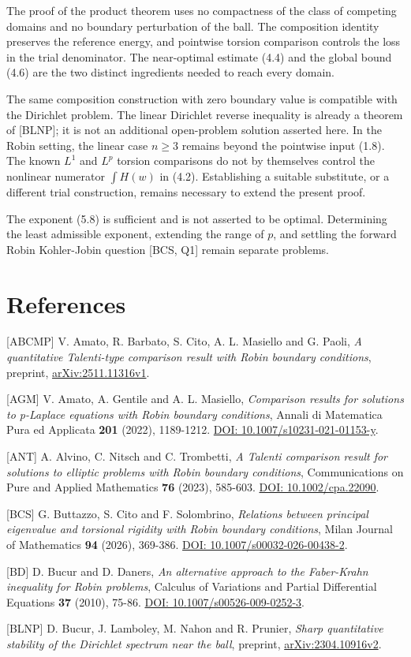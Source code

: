 \documentclass[11pt]{article}
\begin{document}
The proof of the product theorem uses no compactness of the class of
competing domains and no boundary perturbation of the ball. The
composition identity preserves the reference energy, and pointwise
torsion comparison controls the loss in the trial denominator. The
near-optimal estimate (4.4) and the global bound (4.6) are the two
distinct ingredients needed to reach every domain.

The same composition construction with zero boundary value is compatible
with the Dirichlet problem. The linear Dirichlet reverse inequality is
already a theorem of {[}BLNP{]}; it is not an additional open-problem
solution asserted here. In the Robin setting, the linear case \(n\geq3\)
remains beyond the pointwise input (1.8). The known \(L^1\) and \(L^p\)
torsion comparisons do not by themselves control the nonlinear numerator
\(\int H(w)\) in (4.2). Establishing a suitable substitute, or a
different trial construction, remains necessary to extend the present
proof.

The exponent (5.8) is sufficient and is not asserted to be optimal.
Determining the least admissible exponent, extending the range of \(p\),
and settling the forward Robin Kohler-Jobin question {[}BCS, Q1{]}
remain separate problems.

\sloppy\section{References}\label{references}

{[}ABCMP{]} V. Amato, R. Barbato, S. Cito, A. L. Masiello and G. Paoli,
\emph{A quantitative Talenti-type comparison result with Robin boundary
conditions}, preprint,
\href{https://arxiv.org/abs/2511.11316v1}{arXiv:2511.11316v1}.

{[}AGM{]} V. Amato, A. Gentile and A. L. Masiello, \emph{Comparison
results for solutions to p-Laplace equations with Robin boundary
conditions}, Annali di Matematica Pura ed Applicata \textbf{201} (2022),
1189-1212. \href{https://doi.org/10.1007/s10231-021-01153-y}{DOI:
10.1007/s10231-021-01153-y}.

{[}ANT{]} A. Alvino, C. Nitsch and C. Trombetti, \emph{A Talenti
comparison result for solutions to elliptic problems with Robin boundary
conditions}, Communications on Pure and Applied Mathematics \textbf{76}
(2023), 585-603. \href{https://doi.org/10.1002/cpa.22090}{DOI:
10.1002/cpa.22090}.

{[}BCS{]} G. Buttazzo, S. Cito and F. Solombrino, \emph{Relations
between principal eigenvalue and torsional rigidity with Robin boundary
conditions}, Milan Journal of Mathematics \textbf{94} (2026), 369-386.
\href{https://doi.org/10.1007/s00032-026-00438-2}{DOI:
10.1007/s00032-026-00438-2}.

{[}BD{]} D. Bucur and D. Daners, \emph{An alternative approach to the
Faber-Krahn inequality for Robin problems}, Calculus of Variations and
Partial Differential Equations \textbf{37} (2010), 75-86.
\href{https://doi.org/10.1007/s00526-009-0252-3}{DOI:
10.1007/s00526-009-0252-3}.

{[}BLNP{]} D. Bucur, J. Lamboley, M. Nahon and R. Prunier, \emph{Sharp
quantitative stability of the Dirichlet spectrum near the ball},
preprint, \href{https://arxiv.org/abs/2304.10916v2}{arXiv:2304.10916v2}.
\end{document}

